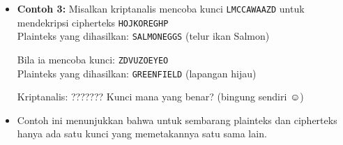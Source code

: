 \documentclass{article}
\begin{document}

\begin{itemize}
  \item \textbf{Contoh 3:} Misalkan kriptanalis mencoba kunci \texttt{LMCCAWAAZD} untuk mendekripsi cipherteks \texttt{HOJKOREGHP} \\
  Plainteks yang dihasilkan: \texttt{SALMONEGGS} \quad (telur ikan Salmon)
  
  \vspace{5mm}
  
  Bila ia mencoba kunci: \texttt{ZDVUZOEYEO} \\
  Plainteks yang dihasilkan: \texttt{GREENFIELD} \quad (lapangan hijau)
  
  \vspace{5mm}
  
  Kriptanalis: ??????? Kunci mana yang benar? (bingung sendiri $\smiley$)
  
  \vspace{5mm}
  
  \item Contoh ini menunjukkan bahwa untuk sembarang plainteks dan cipherteks hanya ada satu kunci yang memetakannya satu sama lain.
\end{itemize}
\end{document}
